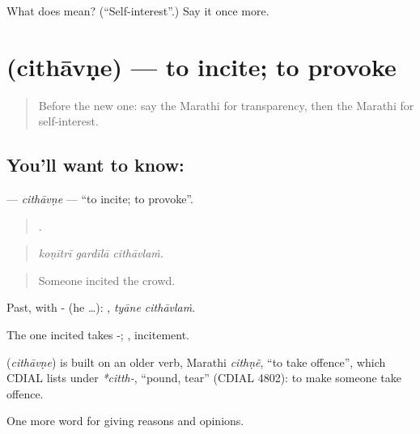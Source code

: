 \begin{tcolorbox}[breakable,colback=teal!4,colframe=teal!35!black,title={Before you move on}]
What does  mean? (\textquotedblleft{}Self-interest\textquotedblright{}.) Say it once more.
\end{tcolorbox}
\section[\texorpdfstring{\mr{चिथावणे} (cithāvṇe)}{चिथावणे (cithāvṇe)}]{ (cithāvṇe) — to incite; to provoke}

\label{lesson:MR-C363-cithavne}



\begin{quote}
Before the new one: say the Marathi for transparency, then the Marathi for self-interest.
\end{quote}

\subsection*{You'll want to know: }
\textbf{} — \emph{cithāvṇe} — \textquotedblleft{}to incite; to provoke\textquotedblright{}.

\begin{quote}
  .
\end{quote}

\begin{quote}
\emph{koṇītrī gardīlā cithāvlaṁ.}
\end{quote}

\begin{quote}
Someone incited the crowd.
\end{quote}

Past, with - (he …):  , \emph{tyāne cithāvlaṁ}.

The one incited takes -; , incitement.

\begin{cousinweb}
\textbf{} (\emph{cithāvṇe}) is built on an older verb, Marathi \emph{cithṇẽ}, \textquotedblleft{}to take offence\textquotedblright{}, which CDIAL lists under \emph{*citth-}, \textquotedblleft{}pound, tear\textquotedblright{} (CDIAL 4802): to make someone take offence.
\end{cousinweb}

\begin{grammarlens}[title={What you've built}]
One more word for giving reasons and opinions.
\end{grammarlens}

